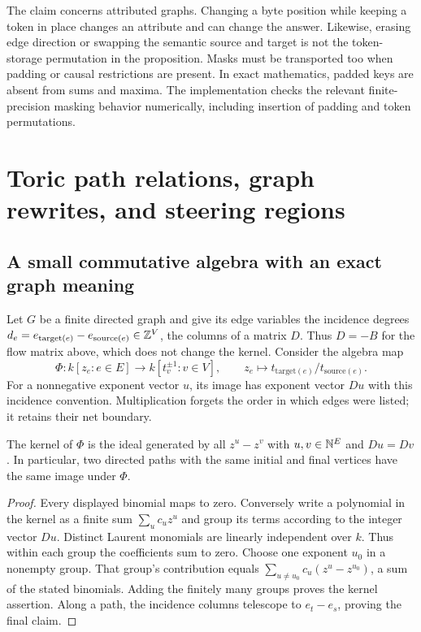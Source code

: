 The claim concerns attributed graphs. Changing a byte position while
keeping a token in place changes an attribute and can change the answer.
Likewise, erasing edge direction or swapping the semantic source and
target is not the token-storage permutation in the proposition. Masks
must be transported too when padding or causal restrictions are present.
In exact mathematics, padded keys are absent from sums and maxima. The
implementation checks the relevant finite-precision masking behavior
numerically, including insertion of padding and token permutations.

\section{Toric path relations, graph rewrites, and steering regions}

\subsection{A small commutative algebra with an exact graph meaning}

Let $G$ be a finite directed graph and give its edge variables the incidence
degrees $d_e=e_{\mathrm{target}(e)}-e_{\mathrm{source}(e)}\in\mathbb{Z}^V$,
the columns of a matrix $D$. Thus $D=-B$ for the flow matrix above, which does not
change the kernel. Consider the algebra map
\[
 \Phi:k[z_e:e\in E]\longrightarrow
 k[t_v^{\pm1}:v\in V],\qquad
 z_e\longmapsto t_{\mathrm{target}(e)}/t_{\mathrm{source}(e)}.
\]
For a nonnegative exponent vector $u$, its image has exponent vector
$Du$ with this incidence convention. Multiplication forgets the order
in which edges were listed; it retains their net boundary.

\begin{proposition}
\label{qt:binomial-kernel}
The kernel of $\Phi$ is the ideal generated by all
$z^u-z^v$ with $u,v\in\mathbb{N}^E$ and $Du=Dv$.
In particular, two directed paths with the same initial and final vertices
have the same image under $\Phi$.
\end{proposition}
\begin{proof}
Every displayed binomial maps to zero. Conversely write a polynomial in
the kernel as a finite sum $\sum_u c_u z^u$ and group its terms according
to the integer vector $Du$. Distinct Laurent monomials are linearly
independent over $k$. Thus within each group the coefficients sum to zero.
Choose one exponent $u_0$ in a nonempty group. That group's contribution
equals $\sum_{u\ne u_0}c_u(z^u-z^{u_0})$, a sum of the stated binomials.
Adding the finitely many groups proves the kernel assertion. Along a path,
the incidence columns telescope to $e_t-e_s$, proving the final claim.
\end{proof}

